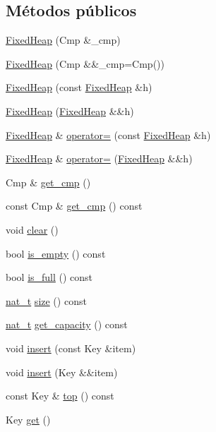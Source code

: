 \subsection*{Métodos públicos}
\begin{DoxyCompactItemize}
\item 
\hyperlink{class_designar_1_1_fixed_heap_ac5dfd33a9ee1cedaad907c51afdf351d}{Fixed\+Heap} (Cmp \&\+\_\+cmp)
\item 
\hyperlink{class_designar_1_1_fixed_heap_adab7bd333df89c4b7f75568619020385}{Fixed\+Heap} (Cmp \&\&\+\_\+cmp=Cmp())
\item 
\hyperlink{class_designar_1_1_fixed_heap_abd58276d0d6e3ff20ea74bea6f6d65bb}{Fixed\+Heap} (const \hyperlink{class_designar_1_1_fixed_heap}{Fixed\+Heap} \&h)
\item 
\hyperlink{class_designar_1_1_fixed_heap_a15eca78039f66fb7944d825c7c53bf02}{Fixed\+Heap} (\hyperlink{class_designar_1_1_fixed_heap}{Fixed\+Heap} \&\&h)
\item 
\hyperlink{class_designar_1_1_fixed_heap}{Fixed\+Heap} \& \hyperlink{class_designar_1_1_fixed_heap_adb8f27056847e1b788e815db1a59db67}{operator=} (const \hyperlink{class_designar_1_1_fixed_heap}{Fixed\+Heap} \&h)
\item 
\hyperlink{class_designar_1_1_fixed_heap}{Fixed\+Heap} \& \hyperlink{class_designar_1_1_fixed_heap_a48202ae9224f22d0e88267279b0616a3}{operator=} (\hyperlink{class_designar_1_1_fixed_heap}{Fixed\+Heap} \&\&h)
\item 
Cmp \& \hyperlink{class_designar_1_1_fixed_heap_a29db925edd7d26a8cd6f8ee970e70b53}{get\+\_\+cmp} ()
\item 
const Cmp \& \hyperlink{class_designar_1_1_fixed_heap_a88f1060c9630d0c8e56fd58370b9a875}{get\+\_\+cmp} () const
\item 
void \hyperlink{class_designar_1_1_fixed_heap_a19f197809e896073e7e2cb05e2f741d1}{clear} ()
\item 
bool \hyperlink{class_designar_1_1_fixed_heap_a58cfde8fd6eedd215b79219970bf8fb8}{is\+\_\+empty} () const
\item 
bool \hyperlink{class_designar_1_1_fixed_heap_a85af858c5200cd8777925e4ae17ca9d2}{is\+\_\+full} () const
\item 
\hyperlink{namespace_designar_aa72662848b9f4815e7bf31a7cf3e33d1}{nat\+\_\+t} \hyperlink{class_designar_1_1_fixed_heap_a96991df55a68490d6ea9fdd10cf6d8ef}{size} () const
\item 
\hyperlink{namespace_designar_aa72662848b9f4815e7bf31a7cf3e33d1}{nat\+\_\+t} \hyperlink{class_designar_1_1_fixed_heap_a6f2b6bb5de9abd4718f07eb1261bee92}{get\+\_\+capacity} () const
\item 
void \hyperlink{class_designar_1_1_fixed_heap_a00227ce55200154dac2fcfb42026e353}{insert} (const Key \&item)
\item 
void \hyperlink{class_designar_1_1_fixed_heap_a7169684fe8e25834174cd2b1edcaf567}{insert} (Key \&\&item)
\item 
const Key \& \hyperlink{class_designar_1_1_fixed_heap_a2b48592e01a0b8836a18415219a310ca}{top} () const
\item 
Key \hyperlink{class_designar_1_1_fixed_heap_a0a274fa702d084e555b917b04ee73b37}{get} ()
\end{DoxyCompactItemize}


